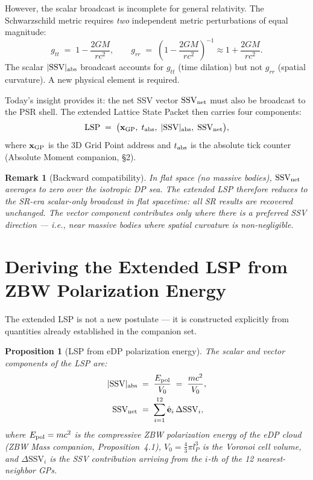 \documentclass[12pt]{article}
\newtheorem{proposition}[theorem]{Proposition}
\newtheorem{remark}[theorem]{Remark}
\newcommand{\lP}{l_P}
\newcommand{\SSV}{\text{SSV}}
\newcommand{\dibit}{\text{LSP}}
\begin{document}
However, the scalar broadcast is incomplete for general relativity.  The
Schwarzschild metric requires \emph{two} independent metric perturbations
of equal magnitude:
\begin{equation}
  g_{tt} \;=\; 1 - \frac{2GM}{rc^2}, \qquad
  g_{rr} \;=\; \left(1 - \frac{2GM}{rc^2}\right)^{-1} \approx 1 + \frac{2GM}{rc^2}.
  \label{eq:Schwarzschild_weak}
\end{equation}
The scalar $|\SSV|_{\rm abs}$ broadcast accounts for $g_{tt}$ (time dilation)
but not $g_{rr}$ (spatial curvature).  A new physical element is required.

Today's insight provides it: the net SSV vector $\mathbf{\SSV}_{\rm net}$
must also be broadcast to the PSR shell.  The extended Lattice State Packet
then carries four components:
\begin{equation}
  \dibit \;=\; \bigl(\mathbf{x}_{\rm GP},\; t_{\rm abs},\;
  |\SSV|_{\rm abs},\; \mathbf{\SSV}_{\rm net}\bigr),
  \label{eq:LSP}
\end{equation}
where $\mathbf{x}_{\rm GP}$ is the 3D Grid Point address and $t_{\rm abs}$
is the absolute tick counter (Absolute Moment companion, \S2).

\begin{remark}[Backward compatibility]
In flat space (no massive bodies), $\mathbf{\SSV}_{\rm net}$ averages to
zero over the isotropic DP sea.  The extended LSP therefore reduces to the
SR-era scalar-only broadcast in flat spacetime: all SR results are recovered
unchanged.  The vector component contributes only where there is a preferred
SSV direction --- i.e., near massive bodies where spatial curvature is
non-negligible.
\end{remark}

\section{Deriving the Extended LSP from ZBW Polarization Energy}
\label{sec:LSP_derivation}

The extended LSP is not a new postulate — it is constructed explicitly
from quantities already established in the companion set.

\begin{proposition}[LSP from eDP polarization energy]
\label{prop:LSP_derivation}
The scalar and vector components of the LSP are:
\begin{align}
  |\SSV|_{\rm abs} &\;=\; \frac{E_{\rm pol}}{V_0}
  \;=\; \frac{mc^2}{V_0},
  \label{eq:SSV_abs_derived}\\
  \mathbf{\SSV}_{\rm net} &\;=\; \sum_{i=1}^{12}
  \hat{\mathbf{e}}_i\,\Delta\SSV_i,
  \label{eq:SSV_net_derived}
\end{align}
where $E_{\rm pol} = mc^2$ is the compressive ZBW polarization energy
of the eDP cloud (ZBW Mass companion, Proposition~4.1), $V_0 = \frac{4}{3}\pi\lP^3$
is the Voronoi cell volume, and $\Delta\SSV_i$ is the SSV contribution
arriving from the $i$-th of the 12 nearest-neighbor GPs.
\end{proposition}
\end{document}
